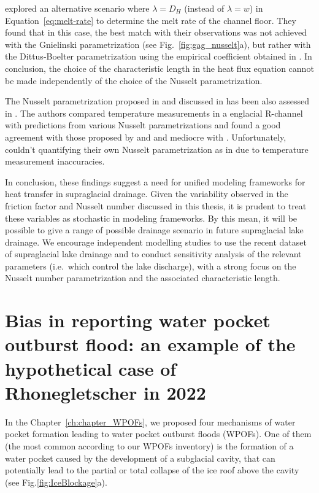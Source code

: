 \cite{Gagliardini&al2024} explored an alternative scenario where $\lambda = D_H$ (instead of $\lambda = w$) in Equation~\ref{eq:melt-rate} to determine the melt rate of the channel floor. They found that in this case, the best match with their observations was not achieved with the Gnielinski parametrization (see Fig.~\ref{fig:gag_nusselt}a), but rather with the Dittus-Boelter parametrization using the empirical coefficient obtained in \cite{Ogier&al2021}. In conclusion, the choice of the characteristic length in the heat flux equation cannot be made independently of the choice of the Nusselt parametrization. 


The Nusselt parametrization proposed in \cite{Ogier&al2021} and discussed in \cite{Gagliardini&al2024} has been also assessed in \cite{pohle&&2022}. The authors compared temperature measurements in a englacial R-channel with predictions from various Nusselt parametrizations \citep{Lunardini&al1986, Clarke2003, Vincent&al2010, Sommers&Rajaram2020, Ogier&al2021} and found a good agreement with those proposed by \cite{Ogier&al2021} and \cite{Vincent&al2010} and mediocre with \cite{Lunardini&al1986,Clarke2003,Sommers&Rajaram2020}. Unfortunately, \cite{pohle&&2022} couldn't quantifying their own Nusselt parametrization as in \cite{Ogier&al2021} due to temperature measurement inaccuracies. 

In conclusion, these findings suggest a need for unified modeling frameworks for heat transfer in supraglacial drainage. Given the variability observed in the friction factor and Nusselt number discussed in this thesis, it is prudent to treat these variables as stochastic in modeling frameworks. By this mean, it will be possible to give a range of possible drainage scenario in future supraglacial lake drainage. We encourage independent modelling studies \citep[e.g.][]{Jarosch&Gudmundsson2012,Kingslake&al2015} to use the recent dataset of supraglacial lake drainage \citep[e.g.][]{Vincent&al2010,Ogier&al2021,Gagliardini&al2024} and to conduct sensitivity analysis of the relevant parameters (i.e.\ which control the lake discharge), with a strong focus on the Nusselt number parametrization and the associated characteristic length. 


\section{Bias in reporting water pocket outburst flood: an example of the hypothetical case of Rhonegletscher in 2022}


In the Chapter~\ref{ch:chapter_WPOFs}, we proposed four mechanisms of water pocket formation leading to water pocket outburst floods (WPOFs). One of them (the most common according to our WPOFs inventory) is the formation of a water pocket caused by the development of a subglacial cavity, that can potentially lead to the partial or total collapse of the ice roof above the cavity (see Fig.\ref{fig:IceBlockage}a). 

